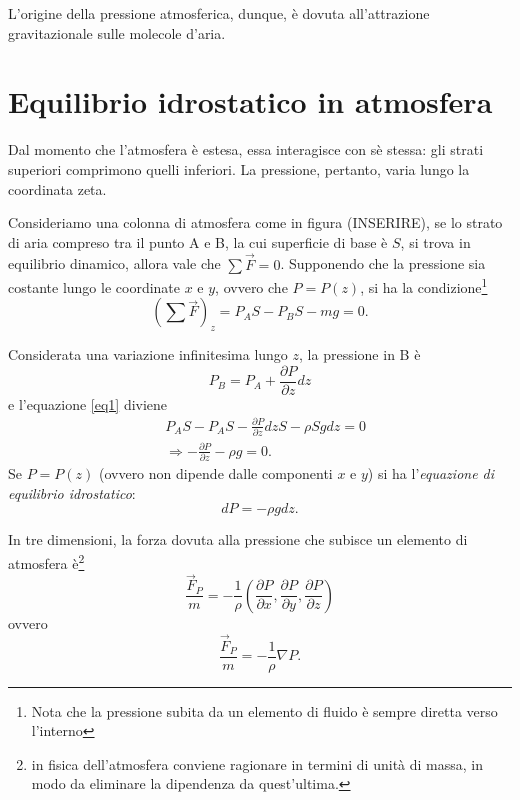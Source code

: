 L'origine della pressione atmosferica, dunque, è dovuta all'attrazione gravitazionale sulle molecole d'aria. 
\section{Equilibrio idrostatico in atmosfera}
Dal momento che l'atmosfera è estesa, essa interagisce con sè stessa: gli strati superiori comprimono quelli inferiori. La pressione, pertanto, varia lungo la coordinata zeta. 

Consideriamo una colonna di atmosfera come in figura (INSERIRE), se lo strato di aria compreso tra il punto A e B, la cui superficie di base è $S$, si trova in equilibrio dinamico, allora vale che $\sum\vec{F}=0$. Supponendo che la pressione sia costante lungo le coordinate $x$ e $y$, ovvero che $P=P(z)$, si ha la condizione\footnote{Nota che la pressione subita da un elemento di fluido è sempre diretta verso l'interno}
\begin{equation}\label{eq1}
	(\sum\vec{F})_z=P_A S - P_B S -mg =0.
\end{equation}

Considerata una variazione infinitesima lungo $z$, la pressione in B è 
\begin{equation}
	P_B=P_A+\frac{\partial P}{\partial z}dz
\end{equation}
e l'equazione \eqref{eq1} diviene
\begin{align}
	&P_A S - P_A S -\frac{\partial P}{\partial z}dzS -\rho S g dz=0\\
	&\Rightarrow -\frac{\partial P}{\partial z}-\rho g =0.
\end{align}
Se $P=P(z)$ (ovvero non dipende dalle componenti $x$ e $y$) si ha l'\emph{equazione di equilibrio idrostatico}:
\begin{equation}\label{idro}
	dP=-\rho g dz.
\end{equation}

In tre dimensioni, la forza dovuta alla pressione che subisce un elemento di atmosfera è\footnote{in fisica dell'atmosfera conviene ragionare in termini di unità di massa, in modo da eliminare la dipendenza da quest'ultima.}
\begin{equation}
	\frac{\vec{F}_P}{m}=-\frac{1}{\rho}\left(\frac{\partial P}{\partial x},\frac{\partial P}{\partial y}, \frac{\partial P}{\partial z}\right)
\end{equation}
ovvero
\begin{equation}
	\frac{\vec{F}_P}{m}=-\frac{1}{\rho}\nabla P.
\end{equation}

